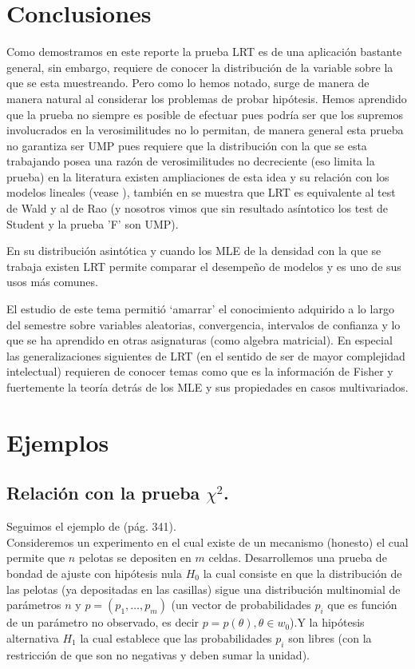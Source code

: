 \documentclass[peerreview]{IEEEtran}
\begin{document}
\section{Conclusiones}
Como demostramos en este reporte la prueba LRT es de una aplicación bastante general, sin embargo, requiere de conocer la distribución de la variable sobre la que se esta muestreando. Pero como lo hemos notado, surge de manera de manera natural al considerar los problemas de probar hipótesis. 
Hemos aprendido que la prueba no siempre es posible de efectuar pues podría ser que los supremos involucrados en la verosimilitudes no lo permitan, de manera general esta prueba no garantiza ser UMP pues requiere que la distribución con la que se esta trabajando posea una razón de verosimilitudes no decreciente (eso limita la prueba) en la literatura existen ampliaciones de esta idea y su relación con los modelos lineales (vease \cite{Wilks}), también en \cite{Wilks} se muestra que LRT es equivalente al test de Wald y al de Rao (y nosotros vimos que sin resultado asíntotico los test de Student y la prueba 'F' son UMP).  

En su distribución asintótica y cuando los MLE de la densidad con la que se trabaja existen LRT permite comparar el desempeño de modelos y es uno de sus usos más comunes. 

El estudio de este tema permitió ‘amarrar’ el conocimiento adquirido a lo largo del semestre sobre variables aleatorias, convergencia, intervalos de confianza y lo que se ha aprendido en otras asignaturas (como algebra matricial). En especial las generalizaciones siguientes de LRT (en el sentido de ser de mayor complejidad intelectual) requieren de conocer temas como que es la información de Fisher y fuertemente la teoría detrás de los MLE y sus propiedades en casos multivariados.



\appendices
\section{ Ejemplos}
\subsection{ Relación con la prueba $\chi^2$.} 
Seguimos el ejemplo de \cite{Rice} (pág. 341).\\ Consideremos un experimento en el cual existe de un mecanismo (honesto) el cual permite que $n$ pelotas se depositen en $m$ celdas. 
Desarrollemos una prueba de bondad de ajuste con hipótesis nula $H_0$ la cual consiste en que la distribución de las pelotas (ya depositadas en las casillas) sigue una distribución multinomial de parámetros $n$ y $p=(p_1,\dots, p_m)$ (un vector de probabilidades $p_i$ que es función de un parámetro no observado, es decir $p=p(\theta ),\theta \in w_0$).Y la hipótesis alternativa $H_1$ la cual establece que las probabilidades $p_i$ son libres (con la restricción de que son no negativas y deben sumar la unidad). 
\end{document}
